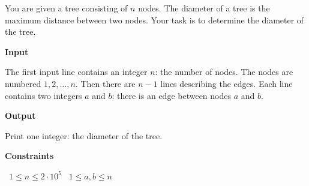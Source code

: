 You are given a tree consisting of $n$ nodes.
The diameter of a tree is the maximum distance between two nodes. Your task is to determine the diameter of the tree.

\vspace{0.3cm}\noindent\textbf{Input}

The first input line contains an integer $n$: the number of nodes. The nodes are numbered $1,2,\ldots,n$.
Then there are $n-1$ lines describing the edges. Each line contains two integers $a$ and $b$: there is an edge between nodes $a$ and $b$.

\vspace{0.3cm}\noindent\textbf{Output}

Print one integer: the diameter of the tree.

\vspace{0.3cm}\noindent\textbf{Constraints}

\textbullet\ $1 \le n \le 2 \cdot 10^5$
\textbullet\ $1 \le a,b \le n$